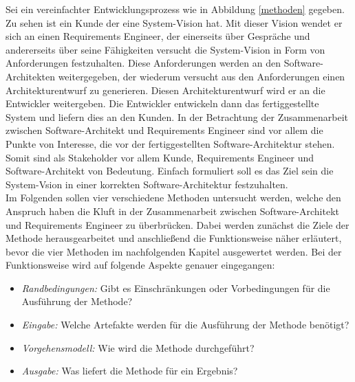 Sei ein vereinfachter Entwicklungsprozess wie in Abbildung \ref{methoden} gegeben. Zu sehen ist ein Kunde der eine System-Vision hat. Mit dieser Vision wendet er sich an einen Requirements Engineer, der einerseits über Gespräche und andererseits über seine Fähigkeiten versucht die System-Vision in Form von Anforderungen festzuhalten. Diese Anforderungen werden an den Software-Architekten weitergegeben, der wiederum versucht aus den Anforderungen einen Architekturentwurf zu generieren. Diesen Architekturentwurf wird er an die Entwickler weitergeben. Die Entwickler entwickeln dann das fertiggestellte System und liefern dies an den Kunden. In der Betrachtung der Zusammenarbeit zwischen Software-Architekt und Requirements Engineer sind vor allem die Punkte von Interesse, die vor der fertiggestellten Software-Architektur stehen. Somit sind als Stakeholder vor allem Kunde, Requirements Engineer und Software-Architekt von Bedeutung. Einfach formuliert soll es das Ziel sein die System-Vsion in einer korrekten Software-Architektur festzuhalten.\\

Im Folgenden sollen vier verschiedene Methoden untersucht werden, welche den Anspruch haben die Kluft in der Zusammenarbeit zwischen Software-Architekt und Requirements Engineer zu überbrücken. Dabei werden zunächst die Ziele der Methode herausgearbeitet und anschließend die Funktionsweise näher erläutert, bevor die vier Methoden im nachfolgenden Kapitel ausgewertet werden. Bei der Funktionsweise wird auf folgende Aspekte genauer eingegangen: \\

\begin{itemize}
\item \textit{Randbedingungen:} Gibt es Einschränkungen oder Vorbedingungen für die Ausführung der Methode?
\item \textit{Eingabe:} Welche Artefakte werden für die Ausführung der Methode benötigt?
\item \textit{Vorgehensmodell:} Wie wird die Methode durchgeführt?
\item \textit{Ausgabe:} Was liefert die Methode für ein Ergebnis? \\
\end{itemize}




